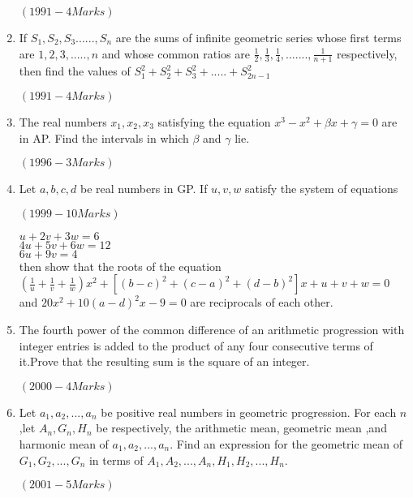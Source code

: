 \documentclass[journal,12pt,twocolumn]{IEEEtran}
\theoremstyle{remark}
\begin{document}
\begin{enumerate}
      \hfill$(1991 -4 Marks)$
      

      \item  If $ S_1,S_2,S_3......,S_n $ are the sums of infinite geometric series whose first terms are $1,2,3,.....,n$ and whose common ratios are $ \frac{1}{2},\frac{1}{3},\frac{1}{4},.......,\frac{1}{n+1} $ respectively, then find the values of $ S_{1}^{2}+S_{2}^{2}+S_{3}^{2}+.....+S_{2n-1}^{2} $
      
      \hfill$(1991 -4 Marks)$
       

		\item  The real numbers $ x_{1},x_{2},x_{3} $ satisfying the equation $ x^{3}-x^{2}+\beta x+\gamma=0 $ are in AP. Find the intervals in which $ \beta $ and $\gamma$ lie.
       
      \hfill$(1996 -3 Marks)$
      

      \item  Let $ a,b,c,d $ be real numbers in GP. If $u,v,w$ satisfy the system of equations  
    
      \hfill$(1999 -10 Marks)$
      
      $    u+2v+3w=6 $ \\
      $    4u+5v+6w=12 $ \\
      $    6u+9v=4 $ \\
      then show that the roots of the equation \\
      $(\frac{1}{u}+\frac{1}{v}+\frac{1}{w})x^{2}+[(b-c)^{2}+(c-a)^{2}+(d-b)^{2}]x+u+v+w=0 $ and $ 20x^{2}+10(a-d)^{2}x-9=0 $ are reciprocals of each other.

      \item The fourth power of the common difference of an arithmetic progression with integer entries is added to the product of any four consecutive terms of it.Prove that the resulting sum is the square of an integer.
      
      \hfill$(2000 -4 Marks)$
    

      \item Let $ a_{1},a_{2},...,a_{n} $ be positive real numbers in geometric progression. For each $n$,let $ A_{n},G_{n},H_{n} $ be respectively, the arithmetic mean, geometric mean ,and harmonic mean of $ a_{1},a_{2},...,a_{n}.$ Find an expression for the geometric mean of $ G_{1},G_{2},...,G_{n} $ in terms of $ A_{1},A_{2},...,A_{n},H_{1},H_{2},...,H_{n}.$ 
      
	                                  \hfill$(2001 -5 Marks)$                              
       

\end{enumerate}
\end{document}
